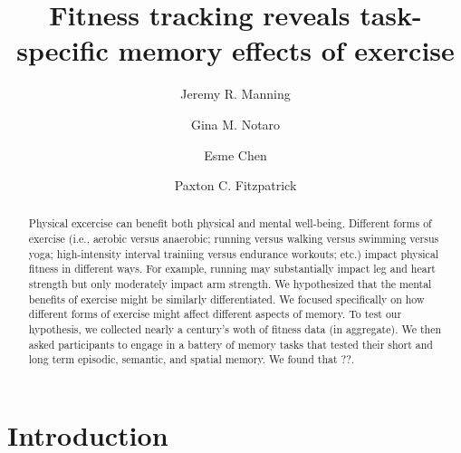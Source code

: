 \documentclass[10pt]{article}
\title{Fitness tracking reveals task-specific memory effects of exercise}
\author[1, $\star$]{Jeremy R. Manning}
\author[1,2]{Gina M. Notaro}
\author[1]{Esme Chen}
\author[1]{Paxton C. Fitzpatrick}
\affil[1]{Dartmouth College, Hanover, NH}
\affil[2]{Lockheed Martin, Bethesda, MD}
\affil[$\star$]{Address correspondence to jeremy.r.manning@dartmouth.edu}
\begin{document}
\maketitle

\begin{abstract}
Physical excercise can benefit both physical and mental well-being.  Different forms of exercise (i.e., aerobic versus anaerobic; running versus walking versus swimming versus yoga; high-intensity interval trainiing versus endurance workouts; etc.) impact physical fitness in different ways.  For example, running may substantially impact leg and heart strength but only moderately impact arm strength. We hypothesized that the mental benefits of exercise might be similarly differentiated.  We focused specifically on how different forms of exercise might affect different aspects of memory.  To test our hypothesis, we collected nearly a century's woth of fitness data (in aggregate).  We then asked participants to engage in a battery of memory tasks that tested their short and long term episodic, semantic, and spatial memory.  We found that ??.
\end{abstract}

\section*{Introduction}
\end{document}
